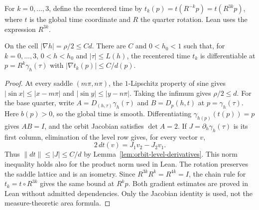\begin{definition}
\label{def:quarter-orbit-time}
\leanok
For $k=0,\ldots,3$, define the recentered time by
$t_k(p)=t(R^{-k}p)=t(R^{3k}p)$, where $t$ is the global time coordinate and $R$ the
quarter rotation. Lean uses the expression $R^{3k}$.
\end{definition}

\begin{lemma}
\label{lem:orbit-coordinate-gradients}
\leanok
On the cell $|\nabla h|=\rho/2\le Cd$. There are $C$ and $0<h_0<1$ such that,
for $k=0,\ldots,3$, $0<h<h_0$ and $|\tau|\le L(h)$, the recentered time $t_k$ is
differentiable at $p=R^k\gamma_h(\tau)$ with $|\nabla t_k(p)|\le C/d(p)$.
\end{lemma}

\begin{proof}
\leanok
At every saddle $(m\pi,n\pi)$, the $1$-Lipschitz property of sine gives
$|\sin x|\le|x-m\pi|$ and $|\sin y|\le|y-n\pi|$.
Taking the infimum gives $\rho/2\le d$.
For the base quarter, write $A=D_{(h,\tau)}\gamma_h(\tau)$ and
$B=D_p(h,t)$ at $p=\gamma_h(\tau)$. Here $b(p)>0$, so the global time
is smooth. Differentiating $\gamma_{h(p)}(t(p))=p$ gives $AB=I$,
and the orbit Jacobian satisfies $\det A=2$.
If $J=\partial_h\gamma_h(\tau)$ is its first column, elimination of
the level row gives, for every vector $v$,
\[
  2\,dt(v)=J_1v_2-J_2v_1.
\]
Thus $\|dt\|\le|J|\le C/d$ by
Lemma~\ref{lem:orbit-level-derivatives}. This norm inequality holds
also for the product norm used in Lean.
The rotation preserves the saddle lattice and is an isometry.
Since $R^{3k}R^k=R^{4k}=I$, the chain rule for
$t_k=t\circ R^{3k}$ gives the same bound at $R^k p$.
Both gradient estimates are proved in Lean without admitted dependencies.
Only the Jacobian identity is used, not the measure-theoretic area formula.
\end{proof}

